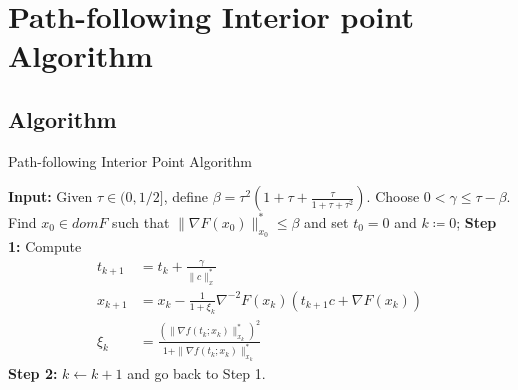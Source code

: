\documentclass[12pt, openany]{report}
\theoremstyle{definition}
\begin{document}
\section{Path-following Interior point Algorithm}
\subsection{Algorithm}
\begin{algorithm}[H]
	\caption{Path-following Interior Point Algorithm}
	\label{alg:PFIP}
	\begin{algorithmic}[1]
		\State \textbf{Input:} Given $\tau\in (0,1/2]$, define $\beta = \tau^2\left(1+\tau+\frac{\tau}{1+\tau+\tau^2}\right)$. Choose $0<\gamma\le \tau-\beta$. Find $x_0\in domF$ such that $\|\nabla F(x_0)\|_{x_0}^* \le \beta$ and set $t_0=0$ and $k\coloneqq0$;
		\State \textbf{Step 1: }Compute 
		\begin{equation}
			\begin{aligned}
				t_{k+1} &= t_k + \frac{\gamma}{\|c\|_x^*}\\
				x_{k+1} &= x_k - \frac{1}{1+\xi_k}\nabla^{-2}F(x_k)(t_{k+1}c+\nabla F(x_k))\\
				\xi_k &= \frac{(\|\nabla f(t_k;x_k)\|_{x_k}^*)^2}{1+\|\nabla f(t_k;x_k)\|_{x_k}^*}
			\end{aligned}
		\end{equation}
		\State \textbf{Step 2:} $k\gets k+1$ and go back to Step 1.
	\end{algorithmic}
\end{algorithm}
\end{document}
